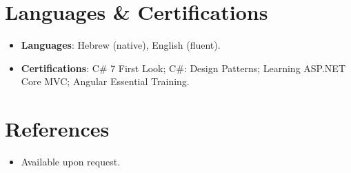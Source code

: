 \documentclass[11pt,a4paper,sans]{moderncv}
\begin{document}

\section{Languages \& Certifications}
\vspace{1pt}
\begin{itemize}
\item \textbf{Languages}: Hebrew (native), English (fluent).
\item \textbf{Certifications}: C\# 7 First Look; C\#: Design Patterns; Learning ASP.NET Core MVC; Angular Essential Training.
\end{itemize}


\section{References}
\vspace{1pt}
\begin{itemize}
\item{Available upon request.}
\end{itemize}
\end{document}
